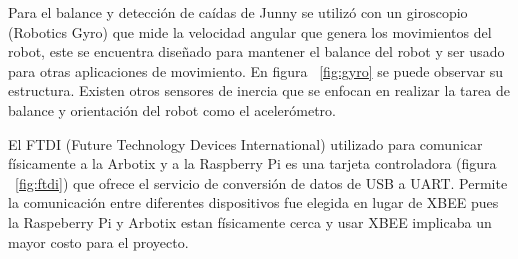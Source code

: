 


Para el balance y detecci\'on de ca\'idas de Junny se utiliz\'o con un giroscopio (Robotics Gyro) que mide la velocidad angular que genera los movimientos del robot, este se encuentra diseñado para mantener el balance del robot y ser usado para otras aplicaciones de movimiento\cite{gyro}. En figura ~\ref{fig:gyro} se puede observar su estructura. Existen otros sensores de inercia que se enfocan en realizar la tarea de balance y orientaci\'on del robot como el aceler\'ometro.



El FTDI (Future Technology Devices International) utilizado para comunicar f\'isicamente a la Arbotix y a la Raspberry Pi  es una tarjeta controladora  (figura ~\ref{fig:ftdi}) que ofrece el servicio de conversión de  datos de USB a UART. Permite la comunicación entre diferentes dispositivos \cite{ftdi} fue elegida en lugar de XBEE pues la Raspeberry Pi y Arbotix estan f\'isicamente cerca y usar XBEE implicaba un mayor costo para el proyecto.


